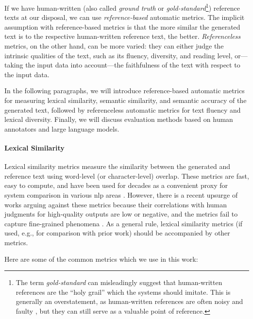 {If we have human-written (also called \emph{ground truth} or \emph{gold-standard}\footnote{The term \emph{gold-standard} can misleadingly suggest that human-written references are the ``holy grail'' which the systems should imitate. This is generally an overstatement, as human-written references are often noisy and faulty \cite{dusekSemanticNoiseMatters2019,clarkAllThatHuman2021}, but they can still serve as a valuable point of reference.}) reference texts at our disposal, we can use \emph{reference-based}  automatic metrics. The implicit assumption with reference-based metrics is that the more similar the generated text is to the respective human-written reference text, the better. \emph{Referenceless} metrics, on the other hand, can be more varied: they can either judge the intrinsic qualities of the text, such as its fluency, diversity, and reading level, or---taking the input data into account---the faithfulness of the text with respect to the input data. \cite{celikyilmazEvaluationTextGeneration2021}

In the following paragraphs, we will introduce  reference-based automatic metrics for measuring lexical similarity, semantic similarity, and semantic accuracy of the generated text, followed by referenceless automatic metrics for text fluency and lexical diversity. Finally, we will discuss evaluation methods based on human annotators and large language models.


\paragraph{Lexical Similarity} Lexical similarity metrics measure the similarity between the generated and reference text using word-level (or character-level) overlap. These metrics are fast, easy to compute, and have been used for decades as a convenient proxy for system comparison in various \ac{nlp} areas \cite{celikyilmazEvaluationTextGeneration2021}. However, there is a recent upsurge of works arguing against these metrics because their correlations with human judgments for high-quality outputs are low or negative, and the metrics fail to capture fine-grained phenomena \cite{mathurTangledBLEUReevaluating2020,kocmiShipNotShip2021,gehrmannRepairingCrackedFoundation2022}. As a general rule, lexical similarity metrics (if used, e.g., for comparison with prior work) should be accompanied by other metrics.

Here are some of the common metrics which we use in this work:

}
